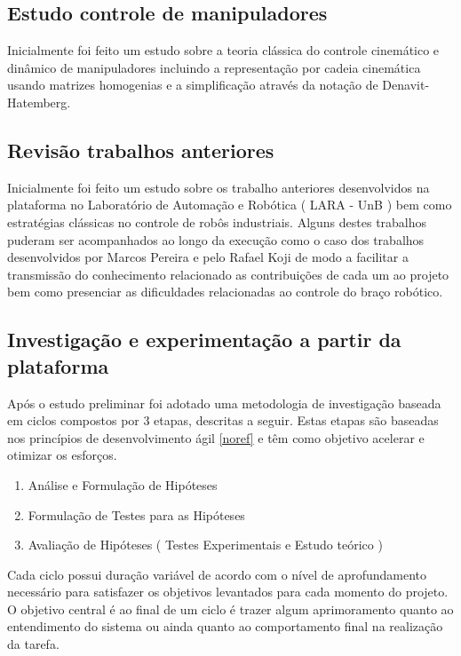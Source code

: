 \subsection{Estudo controle de manipuladores}

Inicialmente foi feito um estudo sobre a teoria clássica do controle cinemático e dinâmico de manipuladores incluindo a representação por cadeia cinemática usando matrizes homogenias e a simplificação através da notação de Denavit-Hatemberg.

\subsection{Revisão trabalhos anteriores}

Inicialmente foi feito um estudo sobre os trabalho anteriores desenvolvidos na plataforma no Laboratório de Automação e Robótica ( LARA - UnB ) bem como estratégias clássicas no controle de robôs industriais. Alguns destes trabalhos puderam ser acompanhados ao longo da execução como o caso dos trabalhos desenvolvidos por Marcos Pereira e pelo Rafael Koji de modo a facilitar a transmissão do conhecimento relacionado as contribuições de cada um ao projeto bem como presenciar as dificuldades relacionadas ao controle do braço robótico.

\subsection{Investigação e experimentação a partir da plataforma}

Após o estudo preliminar foi adotado uma metodologia de investigação baseada em ciclos compostos por 3 etapas, descritas a seguir. Estas etapas são baseadas nos princípios de desenvolvimento ágil \ref{noref} e têm como objetivo acelerar e otimizar os esforços.


\begin{enumerate}
    \item Análise e Formulação de Hipóteses
    \item Formulação de Testes para as Hipóteses
    \item Avaliação de Hipóteses ( Testes Experimentais e Estudo teórico )
\end{enumerate}

Cada ciclo possui duração variável de acordo com o nível de aprofundamento necessário para satisfazer os objetivos levantados para cada momento do projeto. O objetivo central é ao final de um ciclo é trazer algum aprimoramento quanto ao entendimento do sistema ou ainda quanto ao comportamento final na realização da tarefa.

